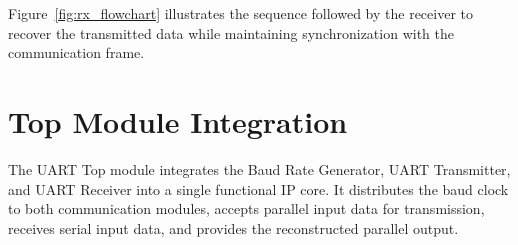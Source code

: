 Figure~\ref{fig:rx_flowchart} illustrates the sequence followed by the receiver to recover the transmitted data while maintaining synchronization with the communication frame.


\section{Top Module Integration}

The UART Top module integrates the Baud Rate Generator, UART Transmitter, and UART Receiver into a single functional IP core. It distributes the baud clock to both communication modules, accepts parallel input data for transmission, receives serial input data, and provides the reconstructed parallel output.

